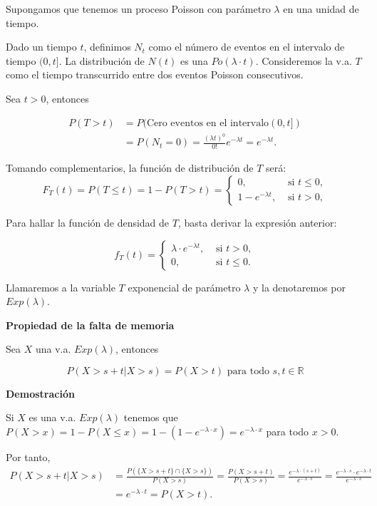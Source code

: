 \documentclass[
  letterpaper,
  DIV=11,
  numbers=noendperiod]{scrreprt}
\begin{document}
Supongamos que tenemos un proceso Poisson con parámetro \(\lambda\) en
una unidad de tiempo.

Dado un tiempo \(t\), definimos \(N_{t}\) como el número de eventos en
el intervalo de tiempo \((0,t]\). La distribución de \(N(t)\) es una
\(Po(\lambda\cdot t)\). Consideremos la v.a. \(T\) como el tiempo
transcurrido entre dos eventos Poisson consecutivos.

Sea \(t>0\), entonces

\[
\begin{array}{rl}
P(T>t)&=P(\mbox{Cero eventos en el intervalo}(0,t])\\
&=P(N_{t}=0)=
         \frac{(\lambda t)^0}{0!} e^{-\lambda
         t}=e^{-\lambda t}.
\end{array}
\]

Tomando complementarios, la función de distribución de \(T\) será: \[
F_{T}(t)= P(T\leq t)=1-P(T>t)=\left\{\begin{array}{ll} 0, &\mbox{ si } t\leq 0,\\
  1-e^{-\lambda t},& \mbox{ si } t>0,\end{array}\right.
\]

Para hallar la función de densidad de \(T\), basta derivar la expresión
anterior:

\[
f_{T}(t)=\left\{\begin{array}{ll}\lambda \cdot e^{-\lambda t}, & \mbox{ si }  t>0,\\
0, & \mbox{ si } t\leq 0. \end{array}\right.
\]

Llamaremos a la variable \(T\) exponencial de parámetro \(\lambda\) y la
denotaremos por \(Exp(\lambda)\).

\textbf{Propiedad de la falta de memoria}

Sea \(X\) una v.a. \(Exp(\lambda)\), entonces

\[P(X>s+t\big|X>s)=P(X>t)\mbox{  para todo } s,t\in \mathbb{R}\]

\textbf{Demostración}

Si \(X\) es una v.a. \(Exp(\lambda)\) tenemos que
\(P(X>x)=1-P(X\leq x)=1-(1-e^{-\lambda\cdot x})=e^{-\lambda\cdot x}\)
para todo \(x>0\).

Por tanto, \[
\begin{array}{rl}
P(X>s+t\big|X>s) & =\frac{P(\{X>s+t\}\cap \{X>s\})}{P(X>s)}=\frac{P(X>s+t)}{P(X>s)}=\frac{e^{-\lambda\cdot (s+t)}}{e^{-\lambda\cdot s}}=
\frac{e^{-\lambda\cdot s}\cdot e^{-\lambda\cdot t} }{e^{-\lambda\cdot s}}\\ & =e^{-\lambda\cdot t}=P(X>t).
\end{array}
\]
\end{document}
